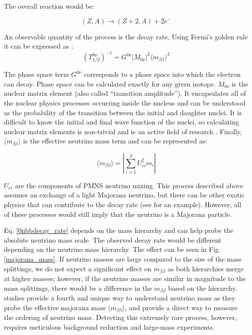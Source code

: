 

The overall reaction would be:

\begin{equation}\label{0nbeta_decay_eq}
(Z,A) \rightarrow (Z+2,A) + 2e^-
\end{equation}

An observable quantity of the process is the decay rate. Using Fermi's golden rule it can be expressed as \cite{mjd2013}:
\begin{equation}\label{0nbbdecay_rate}
(T^{0\nu}_{1/2})^{-1} = G^{0\nu}\left|M_{0\nu}\right|^2\langle m_{\beta\beta}\rangle^2
\end{equation}

The phase space term $G^{0\nu}$ corresponds to a phase space into which the electron can decay. Phase space can be calculated exactly for any given isotope. $M_{0\nu}$ is the nuclear matrix element (also called ``transition amplitude''). It encapsulates all of the nuclear physics processes occurring inside the nucleus and can be understood as the probability of the transition between the initial and daughter nuclei. It is difficult to know the initial and final wave function of the nuclei, so calculating nuclear matrix elements is non-trivial and is an active field of research \cite{Menendez:2017fdf}. Finally, $\langle m_{\beta\beta}\rangle$ is the effective neutrino mass term and can be represented as:

\begin{equation}\label{effective_mjd_mass}
\langle m_{\beta\beta}\rangle =  \left|\sum_{i=1}^{3} U^2_{ei}m_i\right|
\end{equation}

$U_{ei}$ are the components of PMNS neutrino mixing. This process described above assumes an exchange of a light Majorana neutrino, but there can be other exotic physics that can contribute to the decay rate (see \cite{Schechter_1982} for an example). However, all of these processes would still imply that the neutrino is a Majorana particle.

Eq. \ref{0nbbdecay_rate} depends on the mass hierarchy and can help probe the absolute neutrino mass scale. The observed decay rate would be different depending on the neutrino mass hierarchy. The effect can be seen in Fig. \ref{majorana_mass}. If neutrino masses are large compared to the size of the mass splittings, we do not expect a significant effect on $m_{\beta\beta}$ as both hierarchies merge at higher masses; however, if the neutrino masses are similar in magnitude to the mass splittings, there would be a difference in the $m_{\beta\beta}$ based on the hierarchy. {\onbb} studies provide a fourth and unique way to understand neutrino mass as they probe the effective majorana mass $\langle m_{\beta\beta}\rangle$, and provide a direct way to measure the ordering of neutrino mass. Detecting this extremely rare process, however, requires meticulous background reduction and large-mass experiments.

